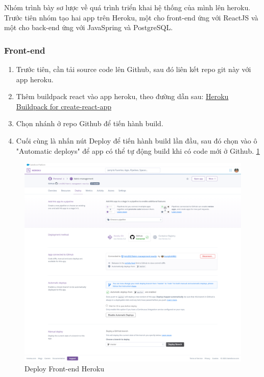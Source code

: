 Nhóm trình bày sơ lược về quá trình triển khai hệ thống của mình lên heroku. Trước tiên nhóm tạo hai app trên Heroku, một cho front-end ứng với ReactJS và một cho back-end ứng với JavaSpring và PostgreSQL. 

\subsubsection{Front-end}
\begin{enumerate}
    \item Trước tiên, cần tải source code lên Github, sau đó liên kết repo git này với app heroku.
    \item Thêm buildpack react vào app heroku, theo đường dẫn sau: \href{https://github.com/mars/create-react-app-buildpack}{Heroku Buildpack for create-react-app}
    \item Chọn nhánh ở repo Github để tiến hành build.
    \item Cuối cùng là nhấn nút Deploy để tiến hành build lần đầu, sau đó chọn vào ô "Automatic deploys" để app có thể tự động build khi có code mới ở Github. \ref{deploy_front_end}
\end{enumerate}

\begin{figure}[H]
    \begin{center}
        \includegraphics[width=16cm]{Image/Technical/deploy-front-end.png}
        \caption{Deploy Front-end Heroku}
        \label{deploy_front_end}
    \end{center}
\end{figure}

